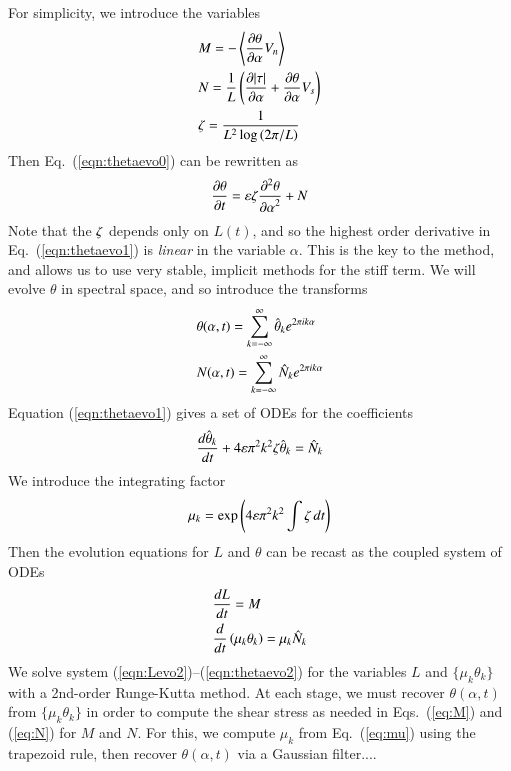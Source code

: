 \documentclass[preprint, 10pt]{elsarticle}
\begin{document}
For simplicity, we introduce the variables
\begin{align}
\label{eq:M}
& M = - \left< \frac{\partial \theta}{\partial \alpha} V_n \right> \\
\label{eq:N}
& N = \frac{1}{L} \left( \frac{\partial \lvert \tau \rvert}{\partial \alpha} + \frac{\partial \theta}{\partial \alpha} V_s \right) \\
& \zeta = \frac{1}{L^{2} \log \left(2\pi/L \right)}
\end{align} 
Then Eq.~(\ref{eqn:thetaevo0}) can be rewritten as
\begin{equation}
\label{eqn:thetaevo1}
\frac{\partial \theta}{\partial t} = \varepsilon \zeta \frac{\partial^2 \theta}{{\partial \alpha}^2} + N
\end{equation}
Note that the $\zeta$ depends only on $L(t)$, and so the highest order derivative in Eq.~(\ref{eqn:thetaevo1}) is {\em linear} in the variable $\alpha$. This is the key to the {\thL} method, and allows us to use very stable, implicit methods for the stiff term. We will evolve $\theta$ in spectral space, and so introduce the transforms
\begin{align}
& \theta(\alpha,t) = \sum_{k = -\infty}^{\infty} \hat{\theta}_k e^{2\pi i k \alpha} \\
& N(\alpha,t)  = \sum_{k = -\infty}^{\infty} \hat{N}_k e^{2\pi i k \alpha}
\end{align}
Equation (\ref{eqn:thetaevo1}) gives a set of ODEs for the coefficients
\begin{equation}
\frac{d \hat{\theta}_k}{d t} +  4 \varepsilon \pi^2 k^2  \zeta \hat{\theta}_k = \hat{N}_k
\end{equation}
We introduce the integrating factor
\begin{equation}
\label{eq:mu}
\mu_k = \exp \left( 4 \varepsilon \pi^2 k^2 \int \zeta \, dt \right)
\end{equation}
Then the evolution equations for $L$ and $\theta$ can be recast as the coupled system of ODEs
\begin{align}
\label{eqn:Levo2}
& \frac{d L}{d t} = M \\
\label{eqn:thetaevo2}
& \frac{d }{d t}\left( \mu_k \theta_k \right) = \mu_k \hat{N}_k
\end{align}
We solve system (\ref{eqn:Levo2})--(\ref{eqn:thetaevo2}) for the variables $L$ and $\{ \mu_k \theta_k \}$ with a 2nd-order Runge-Kutta method. At each stage, we must recover $\theta(\alpha,t)$ from  $\{ \mu_k \theta_k \}$ in order to compute the shear stress as needed in Eqs.~(\ref{eq:M}) and (\ref{eq:N}) for $M$ and $N$. For this, we compute $\mu_k$ from Eq.~(\ref{eq:mu}) using the trapezoid rule, then recover $\theta(\alpha, t)$ via a Gaussian filter....
\end{document}
